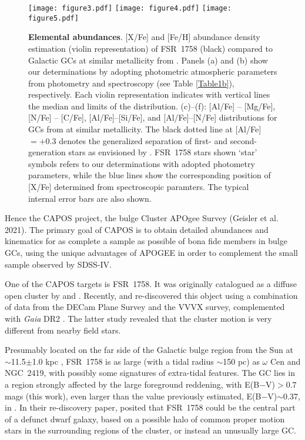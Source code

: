 \documentclass[longauth]{aa} %
\begin{document}
\begin{figure}
	\begin{center}
		\texttt{[image: figure3.pdf]}
		\texttt{[image: figure4.pdf]}		
		\texttt{[image: figure5.pdf]}
		\caption{{\bf  Elemental abundances}. [X/Fe] and [Fe/H] abundance density estimation (violin representation) of FSR~1758 (black) compared to Galactic GCs  at similar metallicity from \citet{Meszaros2020}. Panels (a)  and (b) show our determinations by adopting photometric atmospheric parameters from photometry and spectroscopy (see Table \ref{Table1b}), respectively. Each violin representation indicates with vertical lines the median and limits of the distribution.  (c)--(f):  [Al/Fe] -- [Mg/Fe], [N/Fe] -- [C/Fe], [Al/Fe]--[Si/Fe], and [Al/Fe]--[N/Fe] distributions for GCs from \citet{Meszaros2020} at similar metallicity. The black dotted line at [Al/Fe] $=+0.3$ denotes the generalized separation of first- and second-generation stars as envisioned by \citet{Meszaros2020}. FSR~1758 stars shown `star'  symbols refers to our determinations with adopted photometry parameters, while the blue lines show the corresponding position of [X/Fe] determined from spectroscopic paramters. The typical internal error bars are also shown.}
		\label{Figure2}
	\end{center}
\end{figure}

Hence the CAPOS project, the bulge Cluster APOgee Survey (Geisler et al. 2021). The primary goal of CAPOS is to obtain detailed abundances and kinematics for as complete a sample as possible of bona fide members in bulge GCs, using the unique advantages of APOGEE in order to complement the small sample observed by SDSS-IV. 

One of the CAPOS targets is FSR~1758. It was originally catalogued as a diffuse open cluster by \citet{Froebrich2007} and \citet{Kharchenko2013}. Recently, 
\citet{Cantat-Gaudin2018} and \citet{Barba2019} re-discovered this object using a combination of data from the DECam Plane Survey \citep[DECaPS;][]{Schlafly2018} and the VVVX survey, complemented with \textit{Gaia} DR2 \citep[see][]{Brown2018}. The latter study revealed that the cluster motion is very different from nearby field stars.

Presumably located on the far side of the Galactic bulge region from the Sun at $\sim$11.5$\pm$1.0 kpc \citep{Barba2019}, FSR~1758 is as large (with a tidal radius $\sim$150 pc) as $\omega$ Cen and NGC~2419, with possibly some signatures of extra-tidal features. The GC lies in a region strongly affected by the large foreground reddening, with E(B$-$V)$> 0.7$ mags (this work), even larger than the value previously estimated, E(B$-$V)$\sim$0.37, in \citet{Barba2019}. In their re-discovery paper, \citet{Barba2019} posited that FSR~1758 could be the central part of a defunct dwarf galaxy, based on a possible halo of common proper motion stars in the surrounding regions of the cluster, or instead an unusually large GC. 
\end{document}
